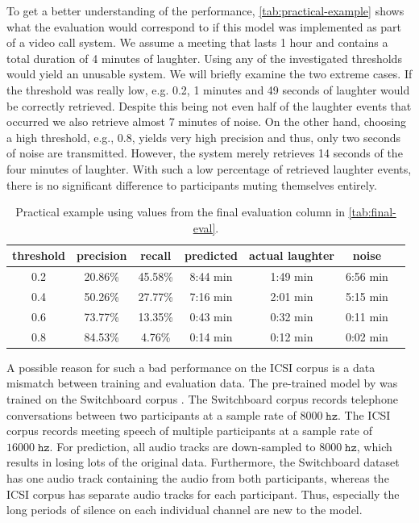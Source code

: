 \documentclass[bsc,frontabs,parskip,deptreport]{infthesis}
\begin{document}
To get a better understanding of the performance, \autoref{tab:practical-example} shows what the evaluation would correspond to if this model was implemented as part of a video call system. We assume a meeting that lasts 1 hour and contains a total duration of 4 minutes of laughter. 
Using any of the investigated thresholds would yield an unusable system.
We will briefly examine the two extreme cases. If the threshold was really low, e.g. 0.2, 1 minutes and 49 seconds of laughter would be correctly retrieved. Despite this being not even half of the laughter events that occurred we also retrieve almost 7 minutes of noise.  
On the other hand, choosing a high threshold, e.g., 0.8, yields very high precision and thus, only two seconds of noise are transmitted. However, the system merely retrieves 14 seconds of the four minutes of laughter. With such a low percentage of retrieved laughter events, there is no significant difference to participants muting themselves entirely. 

\begin{table}[]
    \centering
    \begin{tabular}{|c|c|c|c|c|c|c|}
      \hline
      threshold & precision & recall & predicted & actual laughter & noise \\
      \hline
      0.2 &  20.86\% & 45.58\% & 8:44 min & 1:49 min & 6:56 min \\
      0.4 &  50.26\% & 27.77\% & 7:16 min & 2:01 min & 5:15 min \\
      0.6 &  73.77\% & 13.35\% & 0:43 min & 0:32 min & 0:11 min \\
      0.8 &  84.53\% & 4.76\% & 0:14 min & 0:12 min & 0:02 min \\
      \hline
    \end{tabular}
    \caption{Practical example using values from the final evaluation column in \autoref{tab:final-eval}.}
    \label{tab:practical-example}
\end{table}


A possible reason for such a bad performance on the ICSI corpus is a data mismatch between training and evaluation data. The pre-trained model by \citet{gillick2021robust} was trained on the Switchboard corpus \citep{switchboard-corpus}. The Switchboard corpus records telephone conversations between two participants at a sample rate of $8000\;\mathtt{hz}$. The ICSI corpus records meeting speech of multiple participants at a sample rate of $16000\;\mathtt{hz}$. For prediction, all audio tracks are down-sampled to $8000\;\mathtt{hz}$, which results in losing lots of the original data. 
Furthermore, the Switchboard dataset has one audio track containing the audio from both participants, whereas the ICSI corpus has separate audio tracks for each participant. Thus, especially the long periods of silence on each individual channel are new to the model. 
\end{document}
